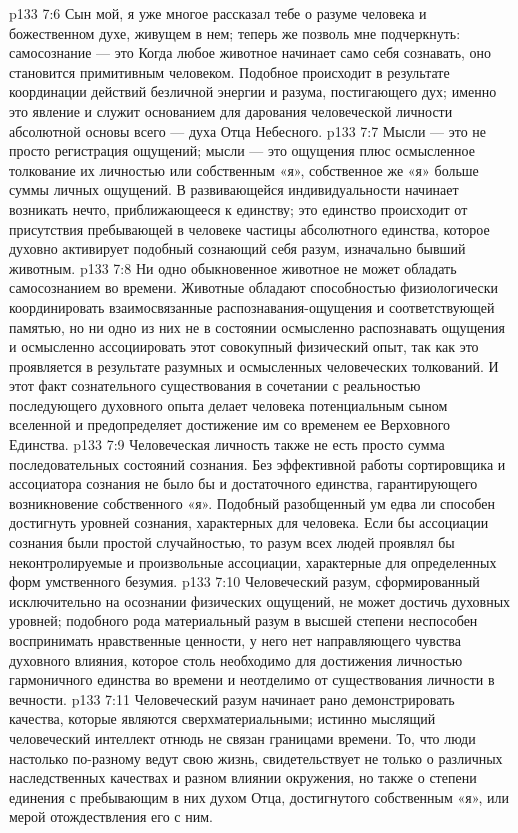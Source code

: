 \vs p133 7:6 \pc Сын мой, я уже многое рассказал тебе о разуме человека и божественном духе, живущем в нем; теперь же позволь мне подчеркнуть: самосознание --- это  Когда любое животное начинает само себя сознавать, оно становится примитивным человеком. Подобное происходит в результате координации действий безличной энергии и разума, постигающего дух; именно это явление и служит основанием для дарования человеческой личности абсолютной основы всего --- духа Отца Небесного.
\vs p133 7:7 Мысли --- это не просто регистрация ощущений; мысли --- это ощущения плюс осмысленное толкование их личностью или собственным «я», собственное же «я» больше суммы личных ощущений. В развивающейся индивидуальности начинает возникать нечто, приближающееся к единству; это единство происходит от присутствия пребывающей в человеке частицы абсолютного единства, которое духовно активирует подобный сознающий себя разум, изначально бывший животным.
\vs p133 7:8 Ни одно обыкновенное животное не может обладать самосознанием во времени. Животные обладают способностью физиологически координировать взаимосвязанные распознавания\hyp{}ощущения и соответствующей памятью, но ни одно из них не в состоянии осмысленно распознавать ощущения и осмысленно ассоциировать этот совокупный физический опыт, так как это проявляется в результате разумных и осмысленных человеческих толкований. И этот факт сознательного существования в сочетании с реальностью последующего духовного опыта делает человека потенциальным сыном вселенной и предопределяет достижение им со временем ее Верховного Единства.
\vs p133 7:9 Человеческая личность также не есть просто сумма последовательных состояний сознания. Без эффективной работы сортировщика и ассоциатора сознания не было бы и достаточного единства, гарантирующего возникновение собственного «я». Подобный разобщенный ум едва ли способен достигнуть уровней сознания, характерных для человека. Если бы ассоциации сознания были простой случайностью, то разум всех людей проявлял бы неконтролируемые и произвольные ассоциации, характерные для определенных форм умственного безумия.
\vs p133 7:10 Человеческий разум, сформированный исключительно на осознании физических ощущений, не может достичь духовных уровней; подобного рода материальный разум в высшей степени неспособен воспринимать нравственные ценности, у него нет направляющего чувства духовного влияния, которое столь необходимо для достижения личностью гармоничного единства во времени и неотделимо от существования личности в вечности.
\vs p133 7:11 Человеческий разум начинает рано демонстрировать качества, которые являются сверхматериальными; истинно мыслящий человеческий интеллект отнюдь не связан границами времени. То, что люди настолько по\hyp{}разному ведут свою жизнь, свидетельствует не только о различных наследственных качествах и разном влиянии окружения, но также о степени единения с пребывающим в них духом Отца, достигнутого собственным «я», или мерой отождествления его с ним.

